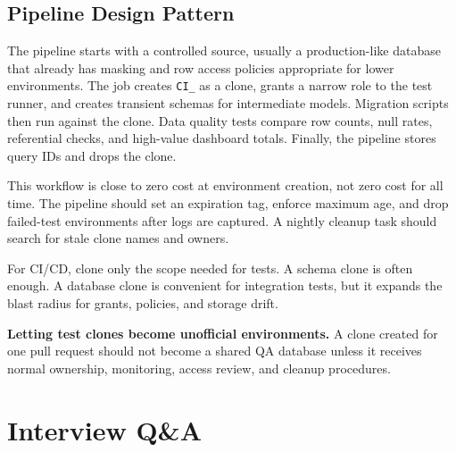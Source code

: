 \subsection{Pipeline Design Pattern}
The pipeline starts with a controlled source, usually a production-like database that already has masking and row access policies appropriate for lower environments. The job creates \texttt{CI\_<build id>} as a clone, grants a narrow role to the test runner, and creates transient schemas for intermediate models. Migration scripts then run against the clone. Data quality tests compare row counts, null rates, referential checks, and high-value dashboard totals. Finally, the pipeline stores query IDs and drops the clone.

This workflow is close to zero cost at environment creation, not zero cost for all time. The pipeline should set an expiration tag, enforce maximum age, and drop failed-test environments after logs are captured. A nightly cleanup task should search for stale clone names and owners.
\begin{tipbox}
For CI/CD, clone only the scope needed for tests. A schema clone is often enough. A database clone is convenient for integration tests, but it expands the blast radius for grants, policies, and storage drift.
\end{tipbox}
\begin{pitfall}
\textbf{Letting test clones become unofficial environments.} A clone created for one pull request should not become a shared QA database unless it receives normal ownership, monitoring, access review, and cleanup procedures.
\end{pitfall}
\section{Interview Q\&A}
